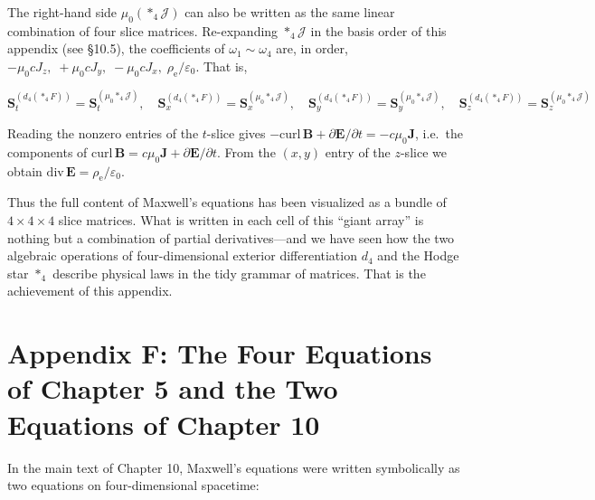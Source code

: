 \documentclass[a4paper,12pt,openany]{book}
\begin{document}
The right-hand side \(\mu_0(\ast_4\mathcal{J})\) can also be written as
the same linear combination of four slice matrices. Re-expanding
\(\ast_4\mathcal{J}\) in the basis order of this appendix (see §10.5),
the coefficients of \(\omega_1\!\sim\!\omega_4\) are, in order,
\(-\mu_0 c J_z,\; +\mu_0 c J_y,\; -\mu_0 c J_x,\; \rho_{\mathrm e}/\varepsilon_0\).
That is,

\[
\mathbf{S}_{t}^{(d_4(\ast_4F))} = \mathbf{S}_{t}^{(\mu_0\ast_4\mathcal{J})},\quad
\mathbf{S}_{x}^{(d_4(\ast_4F))} = \mathbf{S}_{x}^{(\mu_0\ast_4\mathcal{J})},\quad
\mathbf{S}_{y}^{(d_4(\ast_4F))} = \mathbf{S}_{y}^{(\mu_0\ast_4\mathcal{J})},\quad
\mathbf{S}_{z}^{(d_4(\ast_4F))} = \mathbf{S}_{z}^{(\mu_0\ast_4\mathcal{J})}
\]

Reading the nonzero entries of the \(t\)-slice gives
\(-\mathrm{curl}\,\mathbf{B} + \partial\mathbf{E}/\partial t = -c\mu_0\mathbf{J}\),
i.e.~the components of
\(\mathrm{curl}\,\mathbf{B} = c\mu_0\mathbf{J} + \partial\mathbf{E}/\partial t\).
From the \((x,y)\) entry of the \(z\)-slice we obtain
\(\mathrm{div}\,\mathbf{E} = \rho_{\mathrm e}/\varepsilon_0\).

\par\vspace{0.35em}\par

Thus the full content of Maxwell's equations has been visualized as a
bundle of \(4\times4\times4\) slice matrices. What is written in each
cell of this ``giant array'' is nothing but a combination of partial
derivatives—and we have seen how the two algebraic operations of
four-dimensional exterior differentiation \(d_4\) and the Hodge star
\(\ast_4\) describe physical laws in the tidy grammar of matrices. That
is the achievement of this appendix.

\par\vspace{0.35em}\par

\hypertarget{appendix-f-the-four-equations-of-chapter-5-and-the-two-equations-of-chapter-10}{%
\section{Appendix F: The Four Equations of Chapter 5 and the Two
Equations of Chapter
10}\label{appendix-f-the-four-equations-of-chapter-5-and-the-two-equations-of-chapter-10}}

In the main text of Chapter 10, Maxwell's equations were written
symbolically as two equations on four-dimensional spacetime:
\end{document}
